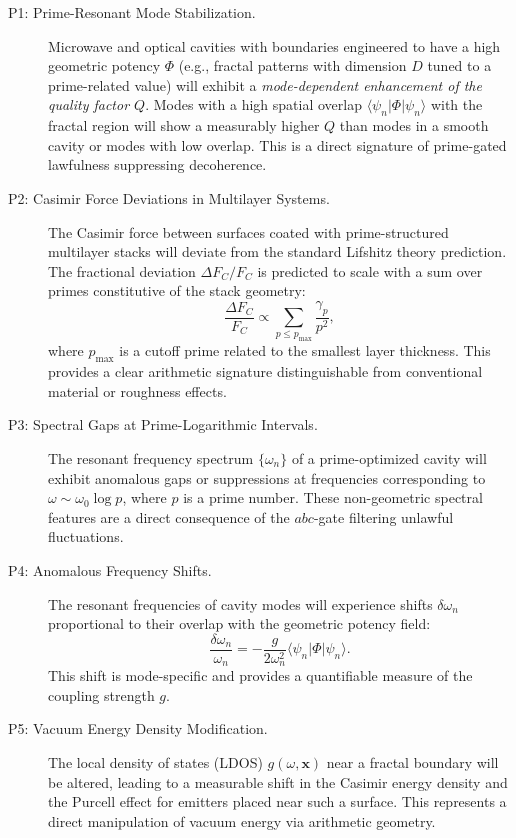 \documentclass[12]{amsart}
\theoremstyle{plain}
\begin{document}
\begin{description}
    \item[P1: Prime-Resonant Mode Stabilization.] 
    Microwave and optical cavities with boundaries engineered to have a high geometric potency $\Phi$ (e.g., fractal patterns with dimension $D$ tuned to a prime-related value) will exhibit a \emph{mode-dependent enhancement of the quality factor $Q$}. Modes with a high spatial overlap $\langle \psi_n | \Phi | \psi_n \rangle$ with the fractal region will show a measurably higher $Q$ than modes in a smooth cavity or modes with low overlap. This is a direct signature of prime-gated lawfulness suppressing decoherence.

    \item[P2: Casimir Force Deviations in Multilayer Systems.]
    The Casimir force between surfaces coated with prime-structured multilayer stacks will deviate from the standard Lifshitz theory prediction. The fractional deviation $\Delta F_C / F_C$ is predicted to scale with a sum over primes constitutive of the stack geometry:
    \[
    \frac{\Delta F_C}{F_C} \propto \sum_{p \leq p_{\mathrm{max}}} \frac{\gamma_p}{p^2},
    \]
    where $p_{\mathrm{max}}$ is a cutoff prime related to the smallest layer thickness. This provides a clear arithmetic signature distinguishable from conventional material or roughness effects.

    \item[P3: Spectral Gaps at Prime-Logarithmic Intervals.]
    The resonant frequency spectrum $\{\omega_n\}$ of a prime-optimized cavity will exhibit anomalous gaps or suppressions at frequencies corresponding to $\omega \sim \omega_0 \log p$, where $p$ is a prime number. These non-geometric spectral features are a direct consequence of the $abc$-gate filtering unlawful fluctuations.

    \item[P4: Anomalous Frequency Shifts.]
    The resonant frequencies of cavity modes will experience shifts $\delta\omega_n$ proportional to their overlap with the geometric potency field:
    \[
    \frac{\delta\omega_n}{\omega_n} = -\frac{g}{2\omega_n^2} \langle \psi_n | \Phi | \psi_n \rangle.
    \]
    This shift is mode-specific and provides a quantifiable measure of the coupling strength $g$.

    \item[P5: Vacuum Energy Density Modification.]
    The local density of states (LDOS) $g(\omega, \mathbf{x})$ near a fractal boundary will be altered, leading to a measurable shift in the Casimir energy density and the Purcell effect for emitters placed near such a surface. This represents a direct manipulation of vacuum energy via arithmetic geometry.
\end{description}
\end{document}
